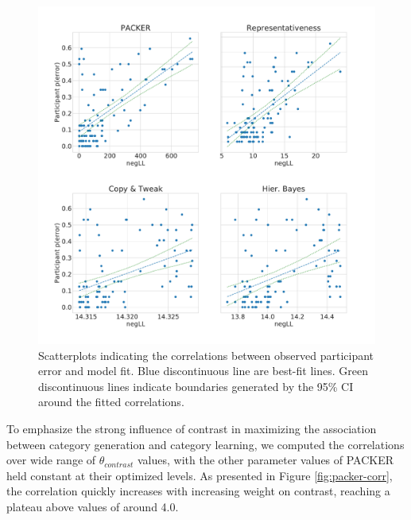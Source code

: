 \documentclass[12pt]{article}
\begin{document}
\begin{flushleft}
\begin{figure}
    \begin{center}
    \includegraphics[width=\textwidth]{figs/modelvspptp.pdf}
    \caption{Scatterplots indicating the correlations between observed
      participant error and model fit. Blue discontinuous line are best-fit
      lines. Green discontinuous lines indicate boundaries generated by the 95\%
      CI around the fitted correlations. }
    \label{fig:perror_corr}
    \end{center}
\end{figure}

To emphasize the strong influence of contrast in maximizing the association
between category generation and category learning, we computed the correlations
over wide range of $\theta_{contrast}$ values, with the other parameter values
of PACKER held constant at their optimized levels. As presented in Figure
\ref{fig:packer-corr}, the correlation quickly increases with increasing weight
on contrast, reaching a plateau above values of around 4.0.


\end{flushleft}
\end{document}
